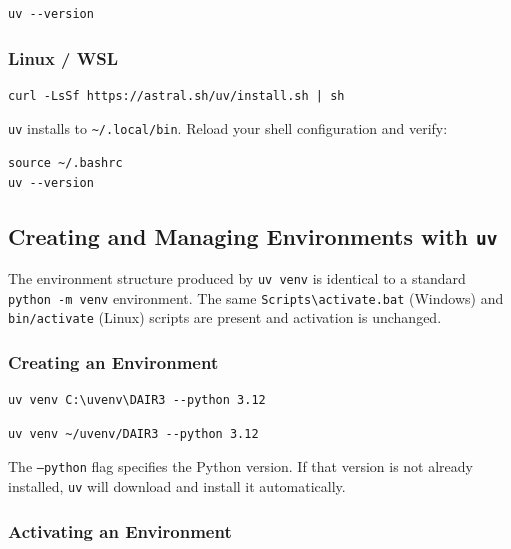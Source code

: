 \begin{lstlisting}[style=windowsStyle]
uv --version
\end{lstlisting}

\subsubsection{Linux / WSL}

\begin{lstlisting}[style=linuxStyle, caption={Installing \texttt{uv} on Linux/WSL}]
curl -LsSf https://astral.sh/uv/install.sh | sh
\end{lstlisting}

\texttt{uv} installs to \texttt{\textasciitilde/.local/bin}. Reload
your shell configuration and verify:

\begin{lstlisting}[style=linuxStyle]
source ~/.bashrc
uv --version
\end{lstlisting}

\subsection{Creating and Managing Environments with \texttt{uv}}

The environment structure produced by \texttt{uv venv} is identical to
a standard \texttt{python -m venv} environment. The same
\texttt{Scripts\textbackslash activate.bat} (Windows) and
\texttt{bin/activate} (Linux) scripts are present and activation is
unchanged.

\subsubsection{Creating an Environment}

\begin{lstlisting}[style=windowsStyle, caption={Creating a uv-managed environment (Windows)}]
uv venv C:\uvenv\DAIR3 --python 3.12
\end{lstlisting}

\begin{lstlisting}[style=linuxStyle, caption={Creating a uv-managed environment (Linux/WSL)}]
uv venv ~/uvenv/DAIR3 --python 3.12
\end{lstlisting}

The \texttt{--python} flag specifies the Python version. If that
version is not already installed, \texttt{uv} will download and
install it automatically.

\subsubsection{Activating an Environment}

